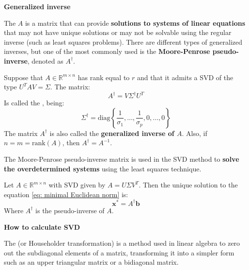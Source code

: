 \highspace
\begin{flushleft}
    \textcolor{Green3}{ \textbf{Generalized inverse}}
\end{flushleft}
The  $A$ is a matrix that can provide \textbf{solutions to systems of linear equations} that may not have unique solutions or may not be solvable using the regular inverse (such as least squares problems). There are different types of generalized inverses, but one of the most commonly used is the \textbf{Moore-Penrose pseudo-inverse}, denoted as $A^{\dagger}$.

\begin{definitionbox}
    Suppose that $A \in \mathbb{R}^{m \times n}$ has rank equal to $r$ and that it admits a SVD of the type $U^{T} A V = \Sigma$. The matrix:
    \begin{equation}
        A^{\dagger} = V \Sigma^{\dagger} U^{T}
    \end{equation}
    Is called the , being:
    \begin{equation}
        \Sigma^{\dagger} = \mathrm{diag}\left\{
            \dfrac{1}{\sigma_{1}},
            \dots,
            \dfrac{1}{\sigma_{p}},
            0,
            \dots,
            0
        \right\}
    \end{equation}
    The matrix $A^{\dagger}$ is also called the \textbf{generalized inverse of $A$}. Also, if $n = m = \mathrm{rank}\left(A\right)$, then $A^{\dagger} = A^{-1}$.
\end{definitionbox}

\noindent
The Moore-Penrose pseudo-inverse matrix is used in the SVD method to \textbf{solve the overdetermined systems} using the least squares technique.

\begin{theorem}
    Let $A \in \mathbb{R}^{m \times n}$ with SVD given by $A = U \Sigma V^{T}$. Then the unique solution to the equation \ref{eq: minimal Euclidean norm} is:
    \begin{equation}
        \mathbf{x}^{*} = A^{\dagger}\mathbf{b}
    \end{equation}
    Where $A^{\dagger}$ is the pseudo-inverse of $A$.
\end{theorem}

\highspace
\begin{flushleft}
    \textcolor{Green3}{ \textbf{How to calculate SVD}}
\end{flushleft}
The  (or Householder transformation) is a method used in linear algebra to zero out the subdiagonal elements of a matrix, transforming it into a simpler form such as an upper triangular matrix or a bidiagonal matrix. 


